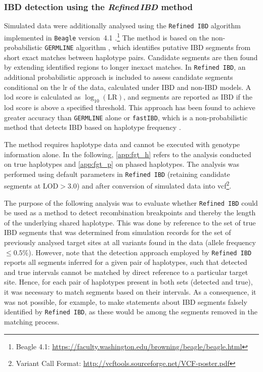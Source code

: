 %
\subsubsection{IBD detection using the \emph{Refined\,IBD} method}\label{sec:ibd_beagle_tru}
%


Simulated data were additionally analysed using the \texttt{Refined\,IBD} algorithm implemented in \texttt{Beagle} version~4.1 \citep{Browning:2013eh}.\footnote{Beagle 4.1: \url{https://faculty.washington.edu/browning/beagle/beagle.html} }
The method is based on the non-probabilistic \texttt{GERMLINE} algorithm \citep{Gusev:2009hd}, which identifies putative IBD segments from short exact matches between haplotype pairs.
Candidate segments are then found by extending identified regions to longer inexact matches.
In \texttt{Refined\,IBD}, an additional probabilistic approach is included to assess candidate segments conditional on the \gls{lr} of the data, calculated under IBD and non-IBD models.
A \gls{lod} score is calculated as ${\log_{10}(\text{LR})}$, and segments are reported as IBD if the \gls{lod} score is above a specified threshold.
This approach has been found to achieve greater accuracy than \texttt{GERMLINE} alone or \texttt{fastIBD}, which is a non-probabilistic method that detects IBD based on haplotype frequency \citep{Browning:2011do,Browning:2013eh}.

The method requires haplotype data and cannot be executed with genotype information alone.
In the following, \cref{app:fgt_h} refers to the analysis conducted on true haplotypes and \cref{app:fgt_p} on phased haplotypes.
The analysis was performed using default parameters in \texttt{Refined\,IBD} (retaining candidate segments at ${\mbox{LOD}>3.0}$) and after conversion of simulated data into \gls{vcf}\footnote{Variant Call Format: \url{http://vcftools.sourceforge.net/VCF-poster.pdf} }.


The purpose of the following analysis was to evaluate whether \texttt{Refined\,IBD} could be used as a method to detect recombination breakpoints and thereby the length of the underlying shared haplotype.
This was done by reference to the set of true IBD segments that was determined from simulation records for the set of previously analysed target sites at all \fk{[2,25]} variants found in the data (allele frequency $\leq 0.5\%$).
However, note that the detection approach employed by \texttt{Refined\,IBD} reports all segments inferred for a given pair of haplotypes, such that detected and true intervals cannot be matched by direct reference to a particular target site.
Hence, for each pair of haplotypes present in both sets (detected and true), it was necessary to match segments based on their intervals.
As a consequence, it was not possible, for example, to make statements about IBD segments falsely identified by \texttt{Refined\,IBD}, as these would be among the segments removed in the matching process.

